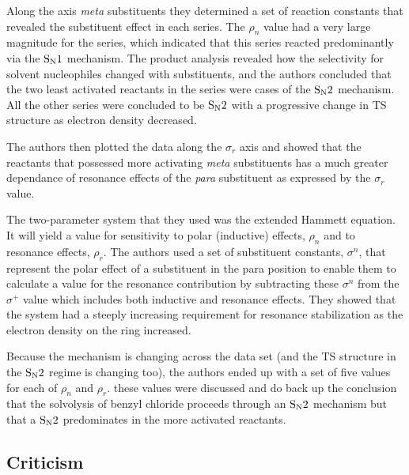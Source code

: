 \documentclass{tufte-handout}
\begin{document}
Along the axis \textit{meta} substituents they determined a set of reaction constants that revealed the substituent effect in each series. The $\rho_n$ value had a very large magnitude for the  series, which indicated that this series reacted predominantly via the $\rm S_N1$ mechanism. The product analysis revealed how the selectivity for solvent nucleophiles changed with substituents, and the authors concluded that the two least activated reactants in the  series were cases of the $\rm S_N2$ mechanism. All the other series were concluded to be $\rm S_N2$ with a progressive change in TS structure as electron density decreased.

The authors then plotted the data along the $\sigma_r$ axis and showed that the reactants that possessed more activating \textit{meta} substituents has a much greater dependance of resonance effects of the \textit{para} substituent as expressed by the $\sigma_r$ value.  

The two-parameter system that they used was the extended Hammett equation. It will yield a value for sensitivity to polar (inductive) effects, $\rho_n$ and to resonance effects, $\rho_r$. The authors used a set of substituent constants, $\sigma^n$, that represent the polar effect of a substituent in the para position to enable them to calculate a value for the resonance contribution by subtracting these $\sigma^n$ from the $\sigma^+$ value which includes both inductive and resonance effects. They showed that the system had a steeply increasing requirement for resonance stabilization as the electron density on the ring increased. 

Because the mechanism is changing across the data set (and the TS structure in the $\rm S_N2$ regime is changing too), the authors ended up with a set of five values for each of $\rho_n$ and $\rho_r$. these values were discussed and do back up the conclusion that the solvolysis of benzyl chloride proceeds through an $\rm S_N2$ mechanism but that a $\rm S_N2$ predominates in the more activated reactants.

\subsection{Criticism}
\end{document}
